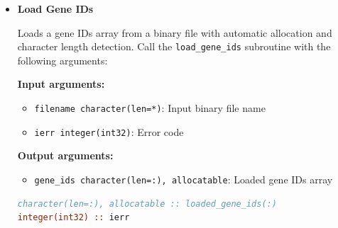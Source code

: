 \begin{enumerate}
\begin{itemize}
                  \textbf{Input arguments:}
                  \begin{itemize}
                    \item \texttt{gene\_ids character(len=*)}: Array of gene identifiers
                          
                    \item \texttt{filename character(len=*)}: Output binary file name
                          
                    \item \texttt{ierr integer(int32)}: Error code
                  \end{itemize}
                  \begin{lstlisting}[language=Fortran, caption={Save Gene IDs Array}]
character(len=256) :: gene_ids(10000)
integer(int32) :: ierr

call save_gene_ids(gene_ids, 'gene_ids.bin', ierr)
                  \end{lstlisting}
                  
            \item \textbf{Load Gene IDs}
                  
                  Loads a gene IDs array from a binary file with automatic allocation and
                  character length detection. Call the \texttt{load\_gene\_ids} subroutine
                  with the following arguments:
                  
                  \textbf{Input arguments:}
                  \begin{itemize}
                    \item \texttt{filename character(len=*)}: Input binary file name
                          
                    \item \texttt{ierr integer(int32)}: Error code
                  \end{itemize}
                  \textbf{Output arguments:}
                  \begin{itemize}
                    \item \texttt{gene\_ids character(len=:), allocatable}: Loaded gene IDs
                          array
                  \end{itemize}
                  \begin{lstlisting}[language=Fortran, caption={Load Gene IDs Array}]
character(len=:), allocatable :: loaded_gene_ids(:)
integer(int32) :: ierr


\end{lstlisting}
\end{itemize}
\end{enumerate}
